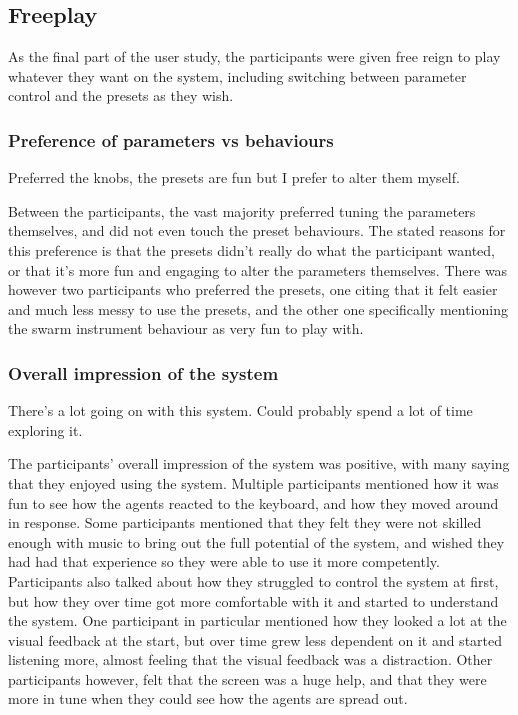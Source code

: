 \documentclass[a4paper,english]{report}
\begin{document}
	\subsection{Freeplay}
	As the final part of the user study, the participants were given free reign to play whatever they want on the system, including switching between parameter control and the presets as they wish.
	\subsubsection{Preference of parameters vs behaviours}
	\begin{displayquote}
		Preferred the knobs, the presets are fun but I prefer to alter them myself.
	\end{displayquote}
	Between the participants, the vast majority preferred tuning the parameters themselves, and did not even touch the preset behaviours. The stated reasons for this preference is that the presets didn't really do what the participant wanted, or that it's more fun and engaging to alter the parameters themselves. There was however two participants who preferred the presets, one citing that it felt easier and much less messy to use the presets, and the other one specifically mentioning the swarm instrument behaviour as very fun to play with.
	\subsubsection{Overall impression of the system}
	\begin{displayquote}
		There's a lot going on with this system. Could probably spend a lot of time exploring it.
	\end{displayquote}
	The participants' overall impression of the system was positive, with many saying that they enjoyed using the system. Multiple participants mentioned how it was fun to see how the agents reacted to the keyboard, and how they moved around in response. Some participants mentioned that they felt they were not skilled enough with music to bring out the full potential of the system, and wished they had had that experience so they were able to use it more competently. Participants also talked about how they struggled to control the system at first, but how they over time got more comfortable with it and started to understand the system. One participant in particular mentioned how they looked a lot at the visual feedback at the start, but over time grew less dependent on it and started listening more, almost feeling that the visual feedback was a distraction. Other participants however, felt that the screen was a huge help, and that they were more in tune when they could see how the agents are spread out.
\end{document}
